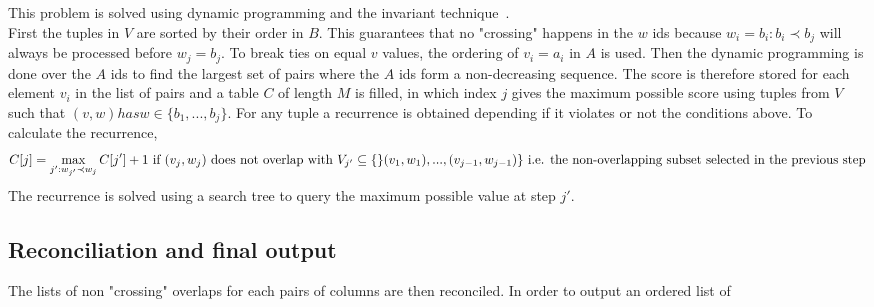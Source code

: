 This problem is solved using dynamic programming and the invariant technique~\cite{genome_scale}.\\
First the tuples in $V$ are sorted by their order in $B$. This guarantees that no "crossing" happens in the $w$ ids because $w_i = b_i: b_i \prec b_j$ will always be processed before $w_j = b_j$. To break ties on equal $v$ values, the ordering of $v_i = a_i$ in $A$ is used. Then the dynamic programming is done over the $A$ ids to find the largest set of pairs where the $A$ ids form a non-decreasing sequence. The score is therefore stored for each element $v_i$ in the list of pairs and a table $C$ of length $M$ is filled, in which index $j$ gives the maximum possible score using tuples from $V$ such that $(v,w) has w \in \{b_1,...,b_j\}$. For any tuple a recurrence is obtained depending if it violates or not the conditions above. To calculate the recurrence, 
\begin{equation} 
C[j] = \max_{j':w_{j'} \prec w_j} C[j'] + 1 \text{ if } (v_j,w_j) \text{ does not overlap with } \\ V_{j'} \subseteq \{\}(v_1,w_1),...,(v_{j-1},w_{j-1})\} \text{ i.e. the non-overlapping subset selected in the previous step}
\end{equation}
The recurrence is solved using a search tree to query the maximum possible value at step $j'$.

\subsection{Reconciliation and final output}
The lists of non "crossing" overlaps for each pairs of columns are then reconciled. In order to output an ordered list of 

